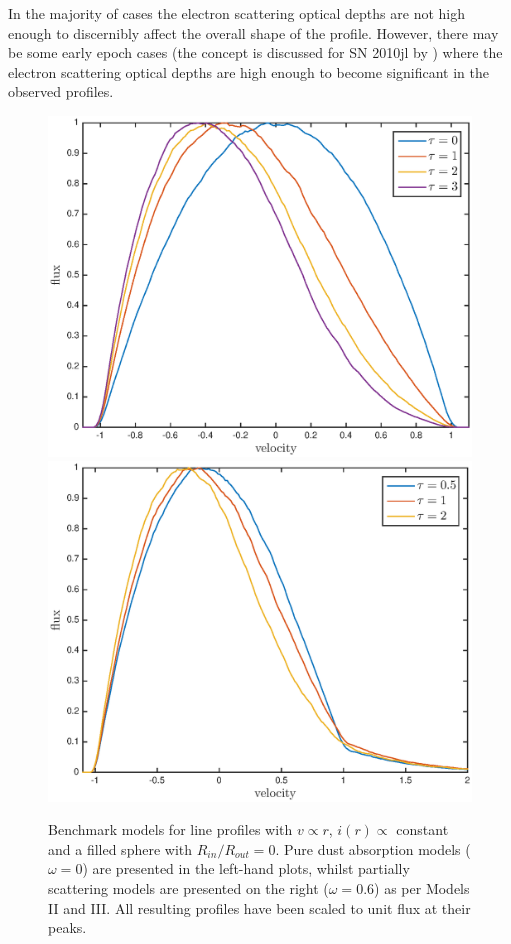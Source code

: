 \documentclass[useAMS,usenatbib,usegraphicx]{mnras}
\begin{document}
In the majority of cases the electron scattering optical depths are not high 
enough to discernibly affect the overall shape of the profile.  However, 
there may be some early epoch cases (the concept is discussed for SN 2010jl 
by \citet{Fransson2014}) where the electron scattering optical depths are high enough to 
become significant in the observed profiles.  

\begin{figure}
\includegraphics[trim =33 10 45 15,clip=true,scale=0.51]{params/opt_thick_w0} 
\includegraphics[trim =33 10 45 15,clip=true,scale=0.51]{params/opt_thick_w0_6}  
\caption{Benchmark models for line profiles  with $v \propto r$, $i(r) \propto$ constant and a filled sphere with $R_{in}/R_{out}=0$.  Pure dust absorption models ($\omega = 0$) are presented in the left-hand plots, whilst partially scattering models are presented on the right ($\omega = 0.6$) as per \citet{Lucy1989} Models II and III. All resulting profiles have been scaled to unit flux at their peaks.}
\label{fig:Lucy}
\end{figure}
\end{document}
